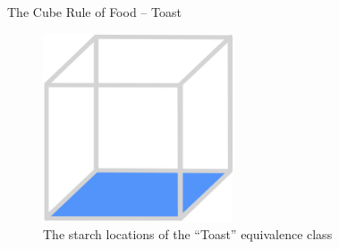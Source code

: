 \documentclass{beamer}
\begin{document}
\begin{frame}{The Cube Rule of Food -- Toast}
    \begin{figure}
        \includegraphics[width=0.5\textwidth]{images/cube_rule_of_food/toast/16_toast.jpg}
        \caption{\label{fig:toast-diagram}The starch locations of the ``Toast'' equivalence class}
    \end{figure}
\end{frame}
\end{document}
